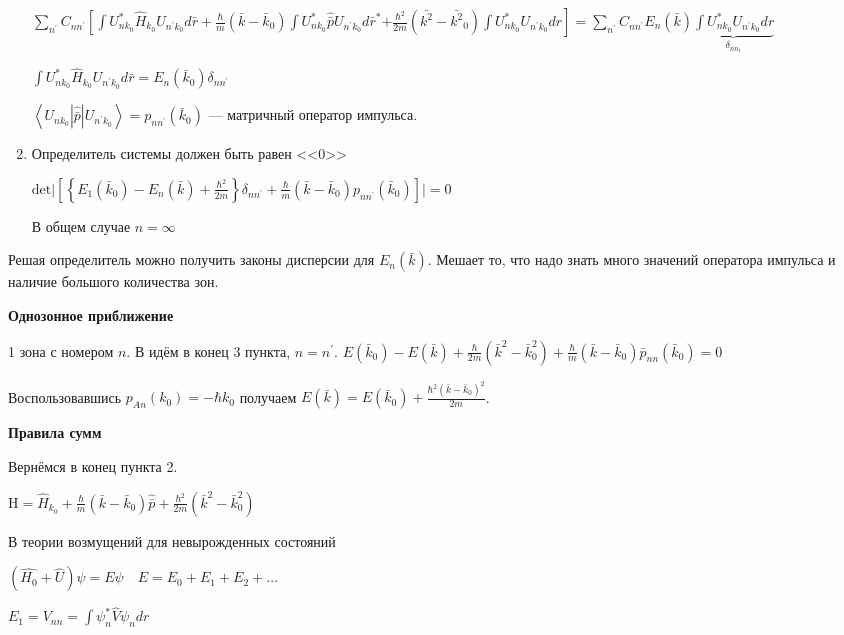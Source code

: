 \begin{enumerate}
    $\sum_{n^{\prime}} C_{n n^{\prime}}\left[\int U_{n k_0}^* \hat{H}_{k_0} U_{n^{\prime} k_0} d \bar{r}\right. +\frac{\hbar}{m}\left(\bar{k}-\bar{k}_0\right) \int U_{n k_0}^* \hat{\bar{p}} U_{n^{\prime} k_0} d \bar{r}^*\left.+\frac{\hbar^2}{2 m}\left(\bar{k^2}- \bar{k^2}_0\right) \int U_{n k_0}^* U_{n^{\prime} k_0} d r\right]= \sum_{n^{\prime}} C_{n n^{\prime}} E_n(\bar{k}) \underbrace{\int U_{n k_0}^* U_{n^{\prime} k_0} d r}_{\delta_{n n_1}}$

    $\int U_{n k_0}^* \hat{H}_{k_0} U_{n^{\prime} k_0} d \bar{r} = E_n (\bar{k}_0)\delta_{nn^\prime}$
    
    $\left\langle U_{n k_0}|\hat{\bar{p}}| U_{n^{\prime} k_0}\right\rangle=p_{n n^{\prime}}\left(\bar{k}_0\right)$ --- матричный оператор импульса.

    \item Определитель системы должен быть равен <<0>>
    
    $\mathrm{det} \Bigg| \left[\left\{E_1(\bar{k}_0)-E_n(\bar{k})+\frac{\hbar^2}{2 m} \right\} \delta_{n n^{\prime}}+\frac{\hbar}{m}(\bar{k}-\bar{k}_0) p_{n n^{\prime}}(\bar{k}_0)\right]  \Bigg| =0$

    В общем случае $n=\infty$

 \end{enumerate}

Решая определитель можно получить законы дисперсии для $E_n(\bar{k})$. Мешает то, что надо знать много значений оператора импульса и наличие большого количества зон.

\textbf{Однозонное приближение}

1 зона с номером $n$. В идём в конец 3 пункта, $n=n^\prime$. $E(\bar{k}_0) - E(\bar{k}) + \frac{\hbar}{2m}(\bar{k}^2 - \bar{k}^{2}_0) + \frac{\hbar}{m}(\bar{k} - \bar{k}_0)\bar{p}_{nn}(\bar{k}_0)=0$

Воспользовавшись $p_{A n}(k_0)=-\hbar k_0$ получаем $E(\bar{k})=E\left(\bar{k}_0\right)+\frac{\hbar^2\left(\bar{k}-\bar{k}_0\right)^2}{2 m}$.

\textbf{Правила сумм}

Вернёмся в конец пункта 2.

$\mathrm{H}=\hat{H}_{k_0}+\frac{\hbar}{m}\left(\bar{k}-\bar{k}_0\right) \hat{\bar{p}}+\frac{\hbar^2}{2 m}\left(\bar{k}^2-\bar{k}_0^2\right)$

В теории возмущений для невырожденных состояний 

$\left(\hat{H_0}+\hat{U}\right) \psi=E \psi \quad E=E_0+E_1+E_2+\ldots$

$E_1=V_{n n}=\int \psi_n^* \hat{V} \psi_n d r$

